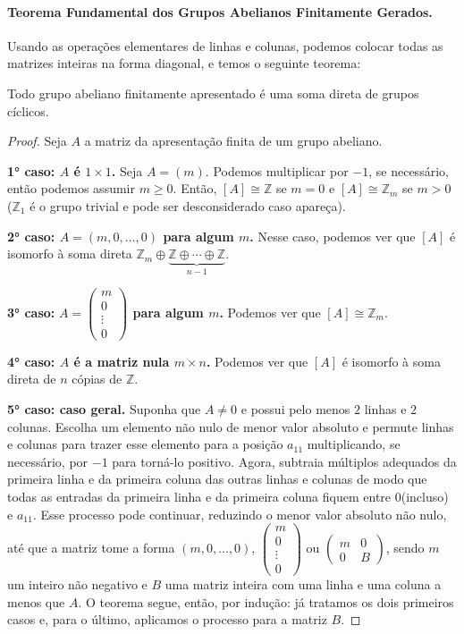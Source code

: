 	\paragraph{Teorema Fundamental dos Grupos Abelianos Finitamente Gerados.} Usando as operações elementares de linhas e colunas, podemos colocar todas as matrizes inteiras na forma diagonal, e temos o seguinte teorema:
	\begin{theorem}
		\label{teorema fundamental abelianos finitamente apresentados}
		Todo grupo abeliano finitamente apresentado é uma soma direta de grupos cíclicos.
	\end{theorem}
	\begin{proof}
		Seja $A$ a matriz da apresentação finita de um grupo abeliano. 
		\par\textbf{1° caso: $A$ é $1\times1$.} Seja $A = (m)$. Podemos multiplicar por $-1$, se necessário, então podemos assumir $m\geq0$. Então, $[A]\cong\mathbb{Z}$ se $m=0$ e $[A]\cong\mathbb{Z}_m$ se $m>0$ ($\mathbb{Z}_1$ é o grupo trivial e pode ser desconsiderado caso apareça).
		\par\textbf{2° caso: $A = (m,0,\dots,0)$ para algum $m$.} Nesse caso, podemos ver que $[A]$ é isomorfo à soma direta $\mathbb{Z}_m\oplus\underbrace{\mathbb{Z}\oplus\cdots\oplus\mathbb{Z}}_{n-1}$.
		\par\textbf{3° caso:} \textbf{$A = \begin{pmatrix}m\\0\\\vdots\\0\end{pmatrix}$ para algum $m$.} Podemos ver que $[A]\cong\mathbb{Z}_m$.
		\par\textbf{4° caso: $A$ é a matriz nula $m\times n$.} Podemos ver que $[A]$ é isomorfo à soma direta de $n$ cópias de $\mathbb{Z}$.
		\par\textbf{5° caso: caso geral.} Suponha que $A\neq0$ e possui pelo menos $2$ linhas e $2$ colunas. Escolha um elemento não nulo de menor valor absoluto e permute linhas e colunas para trazer esse elemento para a posição $a_{11}$ multiplicando, se necessário, por $-1$ para torná-lo positivo. Agora, subtraia múltiplos adequados da primeira linha e da primeira coluna das outras linhas e colunas de modo que todas as entradas da primeira linha e da primeira coluna fiquem entre $0$(incluso) e $a_{11}$. Esse processo pode continuar, reduzindo o menor valor absoluto não nulo, até que a matriz tome a forma $(m,0,\dots,0)$, $\begin{pmatrix}
		m\\
		0\\
		\vdots\\
		0
		\end{pmatrix}$ ou $\begin{pmatrix}
		m & 0 \\
		0 & B
		\end{pmatrix}$, sendo $m$ um inteiro não negativo e $B$ uma matriz inteira com uma linha e uma coluna a menos que $A$. O teorema segue, então, por indução: já tratamos os dois primeiros casos e, para o último, aplicamos o processo para a matriz $B$.  
	\end{proof}

